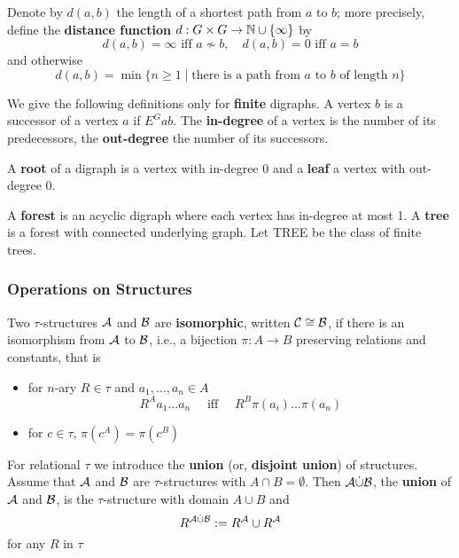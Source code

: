 \documentclass[11pt]{article}
\begin{document}
Denote by \(d(a,b)\) the length of a shortest path from \(a\) to \(b\); more
precisely, define the \textbf{distance function} \(d:G\times G\to\mathbb{N}\cup\{\infty\}\)
by
\begin{equation*}
d(a,b)=\infty\text{ iff }a\not\sim b,\quad d(a,b)=0\text{ iff }a=b
\end{equation*}
and otherwise
\begin{equation*}
d(a,b)=\min\{n\ge1\mid\text{there is a path from $a$ to $b$ of length $n$}\}
\end{equation*}

We give the following definitions only for \textbf{finite} digraphs. A vertex \(b\)
is a successor of a vertex \(a\) if \(E^Gab\). The \textbf{in-degree} of a vertex is
the number of its predecessors, the \textbf{out-degree} the number of its
successors.

A \textbf{root} of a digraph is a vertex with in-degree 0 and a \textbf{leaf} a vertex with
out-degree 0.

A \textbf{forest} is an acyclic digraph where each vertex has in-degree at most 1. A
\textbf{tree} is a forest with connected underlying graph. Let TREE be the class of
finite trees.

\subsubsection{Operations on Structures}
\label{sec:org4ec2c90}
Two \(\tau\)-structures \(\mathcal{A}\) and \(\mathcal{B}\) are \textbf{isomorphic}, written \(\mathcal{C}\cong\mathcal{B}\), if
there is an isomorphism from \(\mathcal{A}\) to \(\mathcal{B}\), i.e., a bijection \(\pi:A\to B\) preserving
relations and constants, that is
\begin{itemize}
\item for \(n\)-ary \(R\in \tau\) and \(a_1,\dots,a_n\in A\)
\begin{equation*}
R^Aa_1\dots a_n \quad\text{ iff }\quad
R^B\pi(a_i)\dots\pi(a_n)
\end{equation*}
\item for \(c\in\tau\), \(\pi(c^A)=\pi(c^B)\)
\end{itemize}


For relational \(\tau\) we introduce the \textbf{union} (or, \textbf{disjoint union}) of structures. Assume
that \(\mathcal{A}\) and \(\mathcal{B}\) are \(\tau\)-structures with \(A\cap B=\emptyset\).
Then \(\mathcal{A}\dot{\cup}\mathcal{B}\), the \textbf{union} of \(\mathcal{A}\) and \(\mathcal{B}\), is the \(\tau\)-structure
with domain \(A\cup B\) and
\begin{equation*}
R^{\mathcal{A}\dot\cup\mathcal{B}}:=R^{\mathcal{A}}\cup R^{\mathcal{A}}
\end{equation*}
for any \(R\) in \(\tau\)
\end{document}
